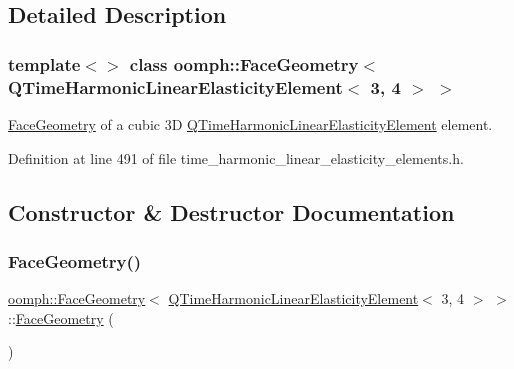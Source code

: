 \subsection{Detailed Description}
\subsubsection*{template$<$$>$\newline
class oomph\+::\+Face\+Geometry$<$ Q\+Time\+Harmonic\+Linear\+Elasticity\+Element$<$ 3, 4 $>$ $>$}

\hyperlink{classoomph_1_1FaceGeometry}{Face\+Geometry} of a cubic 3D \hyperlink{classoomph_1_1QTimeHarmonicLinearElasticityElement}{Q\+Time\+Harmonic\+Linear\+Elasticity\+Element} element. 

Definition at line 491 of file time\+\_\+harmonic\+\_\+linear\+\_\+elasticity\+\_\+elements.\+h.



\subsection{Constructor \& Destructor Documentation}
\mbox{\label{classoomph_1_1FaceGeometry_3_01QTimeHarmonicLinearElasticityElement_3_013_00_014_01_4_01_4_aa9c2b01d55fb4e6369489722d272a2b1}} 
\subsubsection{\texorpdfstring{Face\+Geometry()}{FaceGeometry()}}
{\footnotesize\ttfamily \hyperlink{classoomph_1_1FaceGeometry}{oomph\+::\+Face\+Geometry}$<$ \hyperlink{classoomph_1_1QTimeHarmonicLinearElasticityElement}{Q\+Time\+Harmonic\+Linear\+Elasticity\+Element}$<$ 3, 4 $>$ $>$\+::\hyperlink{classoomph_1_1FaceGeometry}{Face\+Geometry} (\begin{DoxyParamCaption}{ }\end{DoxyParamCaption})\hspace{0.3cm}{\ttfamily [inline]}}



